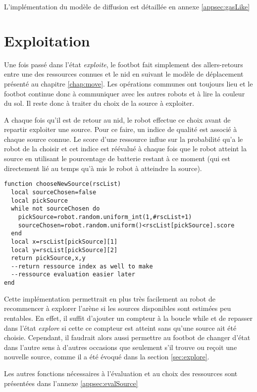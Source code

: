 L'implémentation du modèle de diffusion est détaillée en annexe \ref{appsec:gasLike}

\section{Exploitation}

Une fois passé dans l'état \emph{exploite}, le footbot fait simplement des allers-retours entre une des ressources connues et le nid en suivant le modèle de déplacement présenté au chapitre \ref{chap:move}. Les opérations communes ont toujours lieu et le footbot continue donc à communiquer avec les autres robots et à lire la couleur du sol. Il reste donc à traiter du choix de la source à exploiter.

A chaque fois qu'il est de retour au nid, le robot effectue ce choix avant de repartir exploiter une source. Pour ce faire, un indice de qualité est associé à chaque source connue. Le score d'une ressource influe sur la probabilité qu'a le robot de la choisir et cet indice est réévalué à chaque fois que le robot atteint la source en utilisant le pourcentage de batterie restant à ce moment (qui est directement lié au temps qu'à mis le robot à atteindre la source).

\begin{lstlisting}[caption=Choix de la ressource à exploiter]
function chooseNewSource(rscList)
  local sourceChosen=false
  local pickSource
  while not sourceChosen do
    pickSource=robot.random.uniform_int(1,#rscList+1)
    sourceChosen=robot.random.uniform()<rscList[pickSource].score
  end
  local x=rscList[pickSource][1]
  local y=rscList[pickSource][2]
  return pickSource,x,y
  --return ressource index as well to make
  --ressource evaluation easier later
end
\end{lstlisting}

Cette implémentation permettrait en plus très facilement au robot de recommencer à explorer l'arène si les sources disponibles sont estimées peu rentables. En effet, il suffit d'ajouter un compteur à la boucle while et de repasser dans l'état \emph{explore} si cette ce compteur est atteint sans qu'une source ait été choisie. Cependant, il faudrait alors aussi permettre au footbot de changer d'état dans l'autre sens à d'autres occasions que seulement s'il trouve ou reçoit une nouvelle source, comme il a été évoqué dans la section \ref{sec:explore}.

Les autres fonctions nécessaires à l'évaluation et au choix des ressources sont présentées dans l'annexe \ref{appsec:evalSource}

